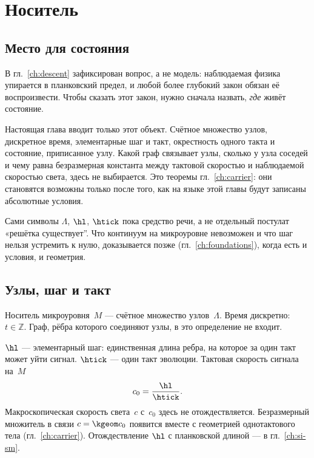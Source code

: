 \chapter{Носитель}
\label{ch:carrier-object}

\section{Место для состояния}
\label{sec:carrier-object}

В гл.~\ref{ch:descent} зафиксирован вопрос, а не модель:
наблюдаемая физика упирается в планковский предел,
и любой более глубокий закон обязан её воспроизвести.
Чтобы сказать этот закон, нужно сначала назвать, \emph{где} живёт состояние.

Настоящая глава вводит только этот объект.
Счётное множество узлов, дискретное время, элементарные шаг и такт,
окрестность одного такта и состояние, приписанное узлу.
Какой граф связывает узлы, сколько у узла соседей
и чему равна безразмерная константа между тактовой скоростью и наблюдаемой скоростью света,
здесь не выбирается.
Это теоремы гл.~\ref{ch:carrier}: они становятся возможны только после того,
как на языке этой главы будут записаны абсолютные условия.

Сами символы $\Lambda$, $\hl$, $\htick$ пока средство речи, а не отдельный постулат
«решётка существует''.
Что континуум на микроуровне невозможен и что шаг нельзя устремить к нулю,
доказывается позже (гл.~\ref{ch:foundations}), когда есть и условия, и геометрия.

\section{Узлы, шаг и такт}
\label{sec:sites-step-tick}

\begin{definition}
\label{def:carrier-sites}
Носитель микроуровня~$M$ --- счётное множество узлов~$\Lambda$.
Время дискретно: $t\in\mathbb{Z}$.
Граф, рёбра которого соединяют узлы, в это определение не входит.
\end{definition}

\begin{definition}
\label{def:step-tick}
$\hl$ --- элементарный шаг: единственная длина ребра, на которое за один такт может уйти сигнал.
$\htick$ --- один такт эволюции.
Тактовая скорость сигнала на~$M$
\[
  c_0 = \frac{\hl}{\htick}.
\]
Макроскопическая скорость света~$c$ с~$c_0$ здесь не отождествляется.
Безразмерный множитель в связи $c=\kgeom c_0$ появится вместе с геометрией
однотактового тела (гл.~\ref{ch:carrier}).
Отождествление $\hl$ с планковской длиной --- в гл.~\ref{ch:si-sm}.
\end{definition}

